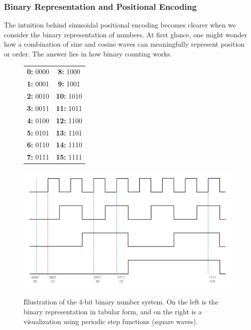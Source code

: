 \subsubsection{Binary Representation and Positional Encoding}
The intuition behind sinusoidal positional encoding becomes clearer when we consider the binary representation of numbers. At 
first glance, one might wonder how a combination of sine and cosine waves can meaningfully represent position or order. The 
answer lies in how binary counting works.
\begin{figure}[H]
    \centering
    \begin{minipage}[t]{0.25\textwidth}
     \vspace{2cm}
        \centering
        \begin{tabular}{c|c}
        \textbf{0:} 0000 & \textbf{8:} 1000 \\
        \textbf{1:} 0001 & \textbf{9:} 1001 \\
        \textbf{2:} 0010 & \textbf{10:} 1010 \\
        \textbf{3:} 0011 & \textbf{11:} 1011 \\
        \textbf{4:} 0100 & \textbf{12:} 1100 \\
        \textbf{5:} 0101 & \textbf{13:} 1101 \\
        \textbf{6:} 0110 & \textbf{14:} 1110 \\
        \textbf{7:} 0111 & \textbf{15:} 1111 \\
        \end{tabular}
    \end{minipage}%
    \hfill
    \begin{minipage}[t]{0.75\textwidth}
     \vspace{0pt}
        \centering
        \includegraphics[width=\linewidth]{images/4_bit_counter.pdf}
        \label{fig:4bit-counter}
    \end{minipage}
    \caption{Illustration of the 4-bit binary number system. On the left is the binary representation in tabular form, and on 
    the right is a visualization using periodic step functions (square waves).}
\end{figure}
